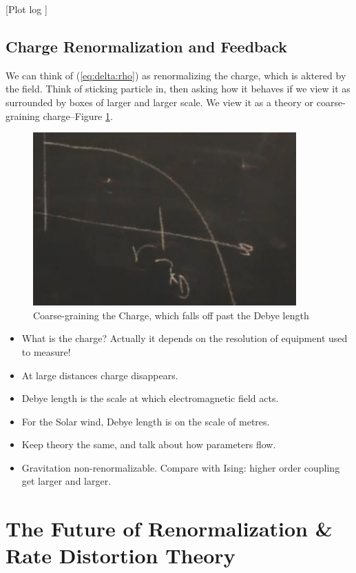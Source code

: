 \documentclass[]{article}
\begin{document}
[Plot log ]
\subsection{Charge Renormalization and Feedback}

We can think of (\ref{eq:delta:rho}) as renormalizing the charge, which is aktered by the field. Think of sticking particle in, then asking how it behaves if we view it as surrounded by boxes of larger and larger scale. We view it as a theory or coarse-graining charge--Figure \ref{fig:coarse_grain_charge}.

\begin{figure}[H]
	\caption{Coarse-graining the Charge, which falls off past the Debye length}\label{fig:coarse_grain_charge}
	\includegraphics[width=0.9\textwidth]{coarse_grain_charge}
\end{figure}

\begin{itemize}
	\item What is the charge? Actually it depends on the resolution of equipment used to measure! 
	\item At large distances charge disappears. 
	\item Debye length is the scale at which electromagnetic field acts.
	\item For the Solar wind, Debye length is on the scale of metres.
	\item Keep theory the same, and talk about how parameters flow.
	\item Gravitation non-renormalizable. Compare with Ising: higher order coupling get larger and larger.
\end{itemize}

\section{The Future of Renormalization \& Rate Distortion Theory}
\end{document}
